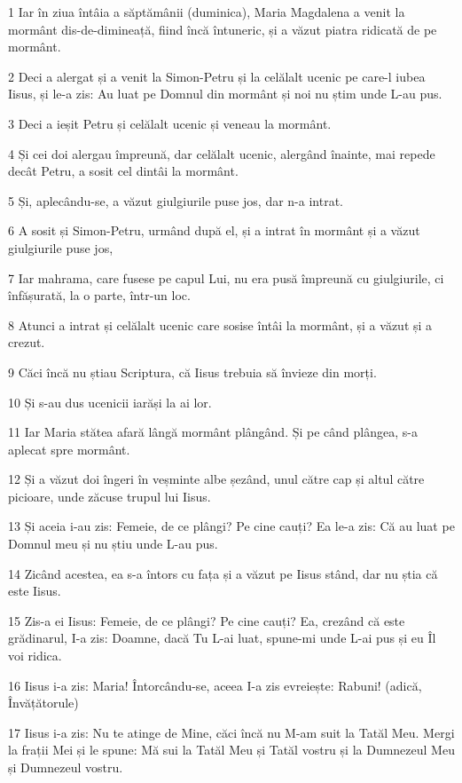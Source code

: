 \par 1 Iar în ziua întâia a săptămânii (duminica), Maria Magdalena a venit la mormânt dis-de-dimineață, fiind încă întuneric, și a văzut piatra ridicată de pe mormânt.
\par 2 Deci a alergat și a venit la Simon-Petru și la celălalt ucenic pe care-l iubea Iisus, și le-a zis: Au luat pe Domnul din mormânt și noi nu știm unde L-au pus.
\par 3 Deci a ieșit Petru și celălalt ucenic și veneau la mormânt.
\par 4 Și cei doi alergau împreună, dar celălalt ucenic, alergând înainte, mai repede decât Petru, a sosit cel dintâi la mormânt.
\par 5 Și, aplecându-se, a văzut giulgiurile puse jos, dar n-a intrat.
\par 6 A sosit și Simon-Petru, urmând după el, și a intrat în mormânt și a văzut giulgiurile puse jos,
\par 7 Iar mahrama, care fusese pe capul Lui, nu era pusă împreună cu giulgiurile, ci înfășurată, la o parte, într-un loc.
\par 8 Atunci a intrat și celălalt ucenic care sosise întâi la mormânt, și a văzut și a crezut.
\par 9 Căci încă nu știau Scriptura, că Iisus trebuia să învieze din morți.
\par 10 Și s-au dus ucenicii iarăși la ai lor.
\par 11 Iar Maria stătea afară lângă mormânt plângând. Și pe când plângea, s-a aplecat spre mormânt.
\par 12 Și a văzut doi îngeri în veșminte albe șezând, unul către cap și altul către picioare, unde zăcuse trupul lui Iisus.
\par 13 Și aceia i-au zis: Femeie, de ce plângi? Pe cine cauți? Ea le-a zis: Că au luat pe Domnul meu și nu știu unde L-au pus.
\par 14 Zicând acestea, ea s-a întors cu fața și a văzut pe Iisus stând, dar nu știa că este Iisus.
\par 15 Zis-a ei Iisus: Femeie, de ce plângi? Pe cine cauți? Ea, crezând că este grădinarul, I-a zis: Doamne, dacă Tu L-ai luat, spune-mi unde L-ai pus și eu Îl voi ridica.
\par 16 Iisus i-a zis: Maria! Întorcându-se, aceea I-a zis evreiește: Rabuni! (adică, Învățătorule)
\par 17 Iisus i-a zis: Nu te atinge de Mine, căci încă nu M-am suit la Tatăl Meu. Mergi la frații Mei și le spune: Mă sui la Tatăl Meu și Tatăl vostru și la Dumnezeul Meu și Dumnezeul vostru.
